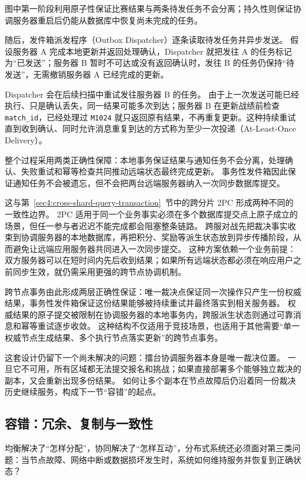 图中第一阶段利用原子性保证比赛结果与两条待发任务不会分离；持久性则保证协调服务器重启后仍能从数据库中恢复尚未完成的任务。

随后，发件箱派发程序（Outbox Dispatcher）逐条读取待发任务并异步发送。
假设服务器 A 完成本地更新并返回处理确认，Dispatcher 就把发往 A 的任务标记为“已发送”；服务器 B 暂时不可达或没有返回确认时，发往 B 的任务仍保持“待发送”，无需撤销服务器 A 已经完成的更新。

Dispatcher 会在后续扫描中重试发往服务器 B 的任务。
由于上一次发送可能已经执行、只是确认丢失，同一结果可能多次到达；服务器 B 在更新战绩前检查 \texttt{match\_id}，已经处理过 \texttt{M1024} 就只返回原有结果，不再重复更新。这种持续重试直到收到确认、同时允许消息重复到达的方式称为至少一次投递（At-Least-Once Delivery）。

整个过程采用两类正确性保障：本地事务保证结果与通知任务不会分离，处理确认、失败重试和幂等检查共同推动远端状态最终完成更新。
事务性发件箱因此保证通知任务不会被遗忘，但不会把两台远端服务器纳入一次同步数据库提交。

这与第~\ref{sec4:cross-shard-query-transaction}~节中的跨分片 2PC 形成两种不同的一致性边界。
2PC 适用于同一个业务事实必须在多个数据库提交点上原子成立的场景，但任一参与者迟迟不能完成都会阻塞整条链路。
跨服对战先把裁决事实收束到协调服务器的本地数据库，再把积分、奖励等派生状态放到异步传播阶段，从而避免让远端应用服务器共同进入一次同步提交。
这种方案依赖一个业务前提：双方服务器可以在短时间内先后收到结果；如果所有远端状态都必须在响应用户之前同步生效，就仍需采用更强的跨节点协调机制。

跨节点事务由此形成两层正确性保证：唯一裁决点保证同一次操作只产生一份权威结果，事务性发件箱保证这份结果能够被持续重试并最终落实到相关服务器。
权威结果的原子提交被限制在协调服务器的本地事务内，跨服派生状态则通过可靠消息和幂等重试逐步收敛。
这种结构不仅适用于竞技场景，也适用于其他需要“单一权威节点生成结果、多个执行节点落实更新”的跨节点事务。

这套设计仍留下一个尚未解决的问题：擂台协调服务器本身是唯一裁决位置。
一旦它不可用，所有区域都无法提交报名和挑战；如果直接部署多个能够独立裁决的副本，又会重新出现多份结果。
如何让多个副本在节点故障后仍沿着同一份裁决历史继续服务，构成下一节“容错”的起点。


\subsection{容错：冗余、复制与一致性}\label{sec4:fault-tolerance}

均衡解决了“怎样分配”，协同解决了“怎样互动”，分布式系统还必须面对第三类问题：当节点故障、网络中断或数据损坏发生时，系统如何维持服务并恢复到正确状态？

